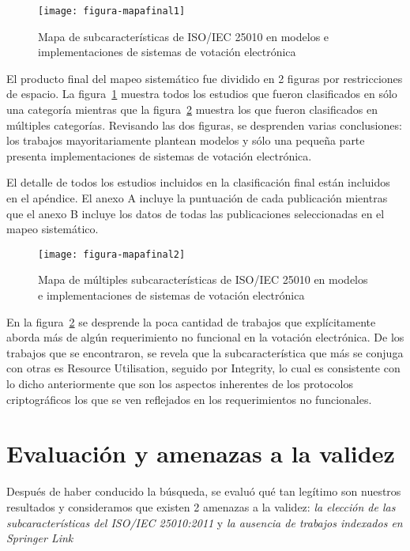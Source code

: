 \begin{figure}[h!]
	\centering
	\texttt{[image: figura-mapafinal1]}
	\caption{Mapa de subcaracterísticas de ISO/IEC 25010 en modelos e 
	implementaciones de sistemas de votación electrónica}
	\label{fig:mapa-final1}
\end{figure}
\bigskip


El producto final del mapeo sistemático fue dividido en 2 figuras por restricciones de espacio. La
figura~\ref{fig:mapa-final1} muestra todos los estudios que fueron clasificados en sólo una categoría
mientras que la figura~\ref{fig:mapa-final2} muestra los que fueron clasificados en múltiples categorías.
Revisando las dos figuras, se desprenden varias conclusiones: los trabajos mayoritariamente 
plantean modelos y sólo una pequeña parte presenta implementaciones de sistemas de votación 
electrónica.  

El detalle de todos los estudios incluidos en la clasificación final están
incluidos en el apéndice. El anexo A incluye la puntuación de cada publicación
mientras que el anexo B incluye los datos de todas las publicaciones seleccionadas
en el mapeo sistemático.

\begin{figure}[h!]
	\centering
	\texttt{[image: figura-mapafinal2]}
	\caption{Mapa de múltiples subcaracterísticas de ISO/IEC 25010 en modelos e 
	implementaciones de sistemas de votación electrónica}
	\label{fig:mapa-final2}
\end{figure}
\bigskip

En la figura~\ref{fig:mapa-final2} se desprende la poca cantidad de trabajos que
explícitamente aborda más de algún requerimiento no funcional en la votación electrónica. 
De los trabajos que se encontraron, se revela que la subcaracterística que más
se conjuga con otras es Resource Utilisation, seguido por Integrity, lo cual es consistente
con lo dicho anteriormente que son los aspectos inherentes de los protocolos criptográficos
los que se ven reflejados en los requerimientos no funcionales.

\newpage
\section{Evaluación y amenazas a la validez}

Después de haber conducido la búsqueda, se evaluó qué tan legítimo son 
nuestros resultados y consideramos que existen 2 amenazas a la validez: 
\textit{la elección de las subcaracterísticas del ISO/IEC 25010:2011} y 
\textit{la ausencia de trabajos indexados en Springer Link} 


